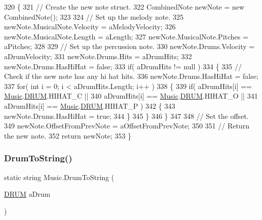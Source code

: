 \begin{DoxyCode}
320     \{
321         \textcolor{comment}{// Create the new note struct.}
322         CombinedNote newNote = \textcolor{keyword}{new} CombinedNote();
323 
324         \textcolor{comment}{// Set up the melody note.}
325         newNote.MusicalNote.Velocity = aMelodyVelocity;
326         newNote.MusicalNote.Length = aLength;
327         newNote.MusicalNote.Pitches = aPitches;
328 
329         \textcolor{comment}{// Set up the percussion note.}
330         newNote.Drums.Velocity = aDrumVelocity;
331         newNote.Drums.Hits = aDrumHits;
332         newNote.Drums.HasHiHat = \textcolor{keyword}{false};
333         \textcolor{keywordflow}{if}( aDrumHits != null )
334         \{
335             \textcolor{comment}{// Check if the new note has any hi hat hits.}
336             newNote.Drums.HasHiHat = \textcolor{keyword}{false};
337             \textcolor{keywordflow}{for}( \textcolor{keywordtype}{int} i = 0; i < aDrumHits.Length; i++ )
338             \{
339                 \textcolor{keywordflow}{if}( aDrumHits[i] == \hyperlink{class_music}{Music}.\hyperlink{group___music_enums_gade475b4382c7066d1af13e7c13c029b6}{DRUM}.HIHAT\_C ||
340                     aDrumHits[i] == \hyperlink{class_music}{Music}.\hyperlink{group___music_enums_gade475b4382c7066d1af13e7c13c029b6}{DRUM}.HIHAT\_O ||
341                     aDrumHits[i] == \hyperlink{class_music}{Music}.\hyperlink{group___music_enums_gade475b4382c7066d1af13e7c13c029b6}{DRUM}.HIHAT\_P )
342                 \{
343                     newNote.Drums.HasHiHat = \textcolor{keyword}{true};
344                 \}
345             \}
346         \}
347 
348         \textcolor{comment}{// Set the offset.}
349         newNote.OffsetFromPrevNote = aOffsetFromPrevNote;
350 
351         \textcolor{comment}{// Return the new note.}
352         \textcolor{keywordflow}{return} newNote;
353     \}
\end{DoxyCode}
\mbox{\label{group___music_static_func_gaf5f64ebe9a7e036e07f283e41f26d22b}} 
\subsubsection{\texorpdfstring{Drum\+To\+String()}{DrumToString()}\hspace{0.1cm}{\footnotesize\ttfamily [1/2]}}
{\footnotesize\ttfamily static string Music.\+Drum\+To\+String (\begin{DoxyParamCaption}\item[{\hyperlink{group___music_enums_gade475b4382c7066d1af13e7c13c029b6}{D\+R\+UM}}]{a\+Drum }\end{DoxyParamCaption})\hspace{0.3cm}{\ttfamily [static]}}



